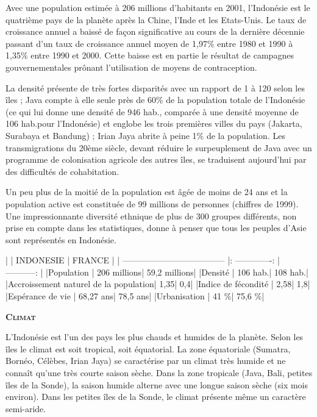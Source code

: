 \begin{multicols}{2}
Avec une population estimée à 206 millions d'habitants en 2001, l'Indonésie est le quatrième pays de la planète après la Chine, l'Inde et les Etats-Unis. Le taux de croissance annuel a baissé de façon significative au cours de la dernière décennie passant d'un taux de croissance annuel moyen de 1,97\% entre 1980 et 1990 à 1,35\% entre 1990 et 2000. Cette baisse est en partie le résultat de campagnes gouvernementales prônant l'utilisation de moyens de contraception.

La densité présente de très fortes disparités avec un rapport de 1 à 120 selon les îles ; Java compte à elle seule près de 60\% de la population totale de l'Indonésie (ce qui lui donne une densité de 946 hab.\kilo\meter\squared, comparée à une densité moyenne de 106 hab.\kilo\meter\squared pour l'Indonésie) et englobe les trois premières villes du pays (Jakarta, Surabaya et Bandung) ; Irian Jaya abrite à peine 1\% de la population. Les transmigrations du 20ème siècle, devant réduire le surpeuplement de Java avec un programme de colonisation agricole des autres îles, se traduisent aujourd'hui par des difficultés de cohabitation.

Un peu plus de la moitié de la population est âgée de moins de 24 ans et la population active est constituée de 99 millions de personnes (chiffres de 1999). Une impressionnante diversité ethnique de plus de 300 groupes différents, non prise en compte dans les statistiques, donne à penser que tous les peuples d'Asie sont représentés en Indonésie.

|                                      |     INDONESIE   |    FRANCE    |
| ------------------------------------ |: -------------: | -----------: |
|Population                            |     206 millions| 59,2 millions|
|Densité                               |      106 hab.\kilo\meter\squared|   108 hab.\kilo\meter\squared|
|Accroissement naturel de la population|             1,35|           0,4|
|Indice de fécondité                   |             2,58|           1,8|
|Espérance de vie                      |        68,27 ans|      78,5 ans|
|Urbanisation                          |             41 \%|        75,6 \%|

\textbf{\textsc{Climat}}

L'Indonésie est l'un des pays les plus chauds et humides de la planète. Selon les îles le climat est soit tropical, soit équatorial. La zone équatoriale (Sumatra, Bornéo, Célèbes, Irian Jaya) se caractérise par un climat très humide et ne connaît qu'une très courte saison sèche. Dans la zone tropicale (Java, Bali, petites îles de la Sonde), la saison humide alterne avec une longue saison sèche (six mois environ). Dans les petites îles de la Sonde, le climat présente même un caractère semi-aride.


\end{multicols}
